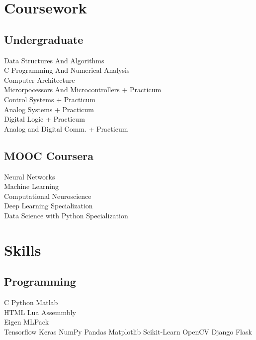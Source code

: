 \documentclass[]{deedy-resume-openfont}
\begin{document}
\begin{minipage}[t]{0.33\textwidth}

\section{Coursework}

\subsection{Undergraduate}
Data Structures And Algorithms \\
C Programming And Numerical Analysis \\
Computer Architecture \\
Microrpocessors And Microcontrollers + Practicum \\
Control Systems + Practicum \\
Analog Systems + Practicum \\
Digital Logic + Practicum \\
Analog and Digital Comm. + Practicum \\ 
\sectionsep

\subsection{MOOC Coursera}
Neural Networks \\
Machine Learning \\
Computational Neuroscience \\
Deep Learning Specialization \\
Data Science with Python Specialization \\


\section{Skills}
\subsection{Programming}
C \textbullet{} Python \textbullet{} Matlab \\
HTML \textbullet{} Lua \textbullet{} Assemmbly \\
Eigen \textbullet{} MLPack \\
Tensorflow \textbullet{} Keras \textbullet{} NumPy \textbullet{} Pandas \textbullet{} Matplotlib \textbullet{} Scikit-Learn \textbullet{} OpenCV \textbullet{} Django \textbullet{} Flask
\sectionsep

%
%

\end{minipage} 
\end{document}
